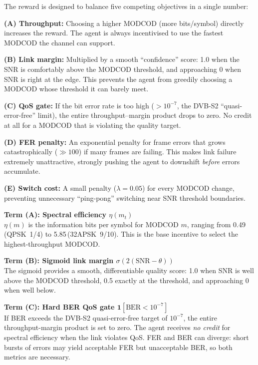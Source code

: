\documentclass[12pt,a4paper]{report}
\begin{document}
\begin{plainenglish}
The reward is designed to balance five competing objectives in a single number:

\textbf{(A) Throughput:} Choosing a higher MODCOD (more bits/symbol) directly
increases the reward.  The agent is always incentivised to use the fastest
MODCOD the channel can support.

\textbf{(B) Link margin:} Multiplied by a smooth ``confidence'' score: 1.0 when
the SNR is comfortably above the MODCOD threshold, and approaching 0 when SNR is
right at the edge.  This prevents the agent from greedily choosing a MODCOD whose
threshold it can barely meet.

\textbf{(C) QoS gate:} If the bit error rate is too high ($> 10^{-7}$, the
DVB-S2 ``quasi-error-free'' limit), the entire throughput--margin product drops to
zero.  No credit at all for a MODCOD that is violating the quality target.

\textbf{(D) FER penalty:} An exponential penalty for frame errors that grows
catastrophically ($\gg 100$) if many frames are failing.  This makes link failure
extremely unattractive, strongly pushing the agent to downshift \emph{before}
errors accumulate.

\textbf{(E) Switch cost:} A small penalty ($\lambda = 0.05$) for every MODCOD
change, preventing unnecessary ``ping-pong'' switching near SNR threshold boundaries.
\end{plainenglish}

\textbf{Term (A): Spectral efficiency $\eta(m_t)$}\\
$\eta(m)$ is the information bits per symbol for MODCOD $m$, ranging from
0.49\,(QPSK~1/4) to 5.85\,(32APSK~9/10). This is the base incentive to
select the highest-throughput MODCOD.

\textbf{Term (B): Sigmoid link margin $\sigma(2(\text{SNR} - \theta))$}\\
The sigmoid provides a smooth, differentiable quality score: 1.0 when SNR
is well above the MODCOD threshold, 0.5 exactly at the threshold, and
approaching 0 when well below.

\textbf{Term (C): Hard BER QoS gate $\mathbf{1}[\text{BER} < 10^{-7}]$}\\
If BER exceeds the DVB-S2 quasi-error-free target of $10^{-7}$, the entire
throughput-margin product is set to zero. The agent receives \emph{no credit}
for spectral efficiency when the link violates QoS. FER and BER can diverge:
short bursts of errors may yield acceptable FER but unacceptable BER, so
both metrics are necessary.
\end{document}
